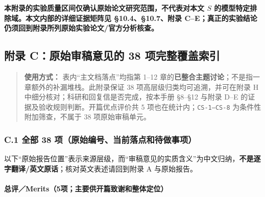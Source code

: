 \documentclass[
  chinese,
  UTF8]{ctexart}
\begin{document}
\textbf{本附录的实验质量区间仅确认原始论文研究范围，不代表对本文 \(S\)
的模型特定排除域。本文内部的详细证据矩阵见 §10.4、§10.7、附录
C--E；真正的实验结论仍须回到附录所列原始实验论文/官方分析核查。}

\subsection{附录 C：原始审稿意见的 38
项完整覆盖索引}\label{ux9644ux5f55-cux539fux59cbux5ba1ux7a3fux610fux89c1ux7684-38-ux9879ux5b8cux6574ux8986ux76d6ux7d22ux5f15}

\begin{quote}
\textbf{使用方式：} 表内``主文档落点''均指第 1--12
章的\textbf{已整合主题讨论}；不是指一章额外的补漏堆栈。此附录保证 38
项高层级归类均可追溯，并可在附录 H
中细分核对；科研和回复信是否完成，按本手册 §8--§12 与附录 D--E
的证据及验收规则判断。开篇优点评价共 5 项也在统计内；\texttt{CS-1–CS-8}
为条件性附加筛查，不属于 38 项原始审稿单元。
\end{quote}

\subsubsection{C.1 全部 38
项（原始编号、当前落点和待做事项）}\label{c.1-ux5168ux90e8-38-ux9879ux539fux59cbux7f16ux53f7ux5f53ux524dux843dux70b9ux548cux5f85ux505aux4e8bux9879}

以下``原始报告位置''表示来源层级，而``审稿意见的实质含义''为中文归纳，\textbf{不是逐字翻译/英文原话}；核对英文表述请回到附录
A 与原始报告。

\paragraph{总评／Merits（5项；主要供开篇致谢和整体定位）}\label{ux603bux8bc4merits5ux9879ux4e3bux8981ux4f9bux5f00ux7bc7ux81f4ux8c22ux548cux6574ux4f53ux5b9aux4f4d}
\end{document}
